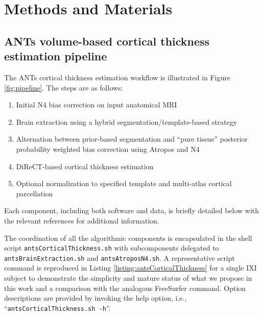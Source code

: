\section{Methods and Materials}

\subsection{ANTs volume-based cortical thickness estimation pipeline}

The ANTs cortical thickness estimation workflow is illustrated
in Figure \ref{fig:pipeline}.  The steps are as follows:
\begin{enumerate}
  \item Initial N4 bias correction on input anatomical MRI
  \item Brain extraction using a hybrid segmentation/template-based strategy
  \item Alternation between prior-based segmentation and ``pure tissue''
        posterior probability weighted bias correction using Atropos and N4
  \item DiReCT-based cortical thickness estimation
  \item Optional normalization to specified template and multi-atlas
    cortical parcellation
\end{enumerate}
Each component, including both software and data, is briefly detailed 
below with the relevant references for additional information. 

The coordination of all the algorithmic components is
encapsulated in the shell script {\tt antsCorticalThickness.sh} with
subcomponents delegated to {\tt antsBrainExtraction.sh} 
and {\tt antsAtroposN4.sh}.  A representative script command 
is reproduced in Listing \ref{listing:antsCorticalThickness} for
a single IXI subject to demonstrate the simplicity and
mature status of what we propose in this work and a comparison
with the analogous FreeSurfer command.  
Option descriptions are provided by invoking the
help option, i.e., ``{\tt antsCorticalThickness.sh -h}''.

